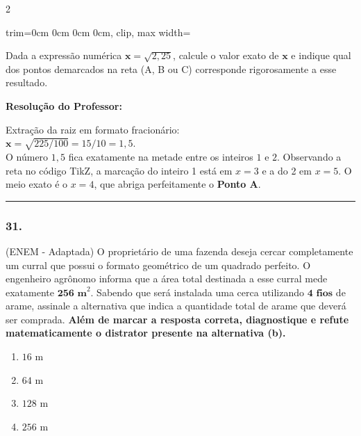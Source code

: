\begin{multicols*}{2}
\begin{center}
\begin{adjustbox}{trim=0cm 0cm 0cm 0cm, clip, max width=\larguraTikz}
\end{adjustbox}
\end{center}
Dada a expressão numérica $ \textbf{x} = \sqrt{2,25} $, calcule o valor exato de $ \textbf{x} $ e indique qual dos pontos demarcados na reta (A, B ou C) corresponde rigorosamente a esse resultado.

\ifgabarito
    \begin{tcolorbox}[colback=CorTitUm!5, colframe=CorTitUm, boxrule=1pt, arc=4pt, left=6pt, right=6pt, top=6pt, bottom=6pt]
    \small\textbf{\textcolor{CorTitUm}{Resolução do Professor:}}\par\vspace{0.1cm}
    \color{CinzaEscuro}
    Extração da raiz em formato fracionário:\\
    $ \textbf{x} = \sqrt{225/100} = 15/10 = 1,5 $.\\
    O número $ 1,5 $ fica exatamente na metade entre os inteiros $ 1 $ e $ 2 $. Observando a reta no código TikZ, a marcação do inteiro 1 está em $ x=3 $ e a do 2 em $ x=5 $. O meio exato é o $ x=4 $, que abriga perfeitamente o \textbf{Ponto A}.
    \end{tcolorbox}
\fi

\par\vspace{\espacoQuestao}

\noindent\textcolor{CorLinha}{\rule{\linewidth}{0.5pt}} 
\par\vspace{\espacoPreQuestao}
\subsubsection*{31.} (ENEM - Adaptada) O proprietário de uma fazenda deseja cercar completamente um curral que possui o formato geométrico de um quadrado perfeito. O engenheiro agrônomo informa que a área total destinada a esse curral mede exatamente $ \textbf{256 m}^{2} $. Sabendo que será instalada uma cerca utilizando $ \textbf{4 fios} $ de arame, assinale a alternativa que indica a quantidade total de arame que deverá ser comprada. \textbf{Além de marcar a resposta correta, diagnostique e refute matematicamente o distrator presente na alternativa (b).}
\begin{enumerate}[label=\alph*), itemsep=\espacoAlt]
    \item $ 16 \text{ m} $
    \item $ 64 \text{ m} $
    \item $ 128 \text{ m} $
    \item $ 256 \text{ m} $
\end{enumerate}


\end{multicols*}
